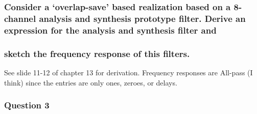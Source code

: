 \documentclass[
  a4paper,
  ,captions=tableheading
]{scrartcl}
\begin{document}
\begin{enumerate}
  \subsubsection{Consider a `overlap-save' based realization based on a
  8-channel analysis and synthesis prototype filter. Derive an
  expression for the analysis and synthesis filter
  and}\label{consider-a-overlap-save-based-realization-based-on-a-8-channel-analysis-and-synthesis-prototype-filter.-derive-an-expression-for-the-analysis-and-synthesis-filter-and}
\end{enumerate}

\subsubsection{sketch the frequency response of this
filters.}\label{sketch-the-frequency-response-of-this-filters.}

See slide 11-12 of chapter 13 for derivation. Frequency responses are
All-pass (I think) since the entries are only ones, zeroes, or delays.

\subsubsection{Question 3}\label{question-3-4}
\end{document}

